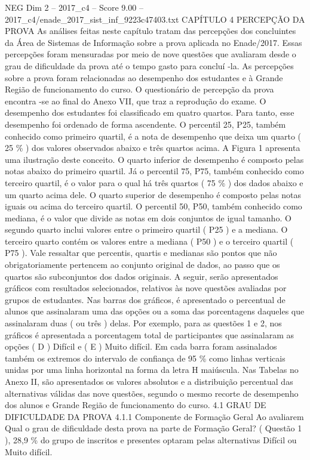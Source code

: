 \begin{textsample}{NEG Dim 2 – 2017\_c4 – Score 9.00 – 2017\_c4/enade\_2017\_sist\_inf\_9223c47403.txt}  \label{ex:f2_neg_335}
CAPÍTULO 4 PERCEPÇÃO DA PROVA As análises feitas neste capítulo tratam das percepções dos concluintes da Área de Sistemas de Informação sobre a prova aplicada no Enade/2017.
Essas percepções foram mensuradas por meio de nove questões que avaliaram desde o grau de dificuldade da prova até o tempo gasto para concluí -la.
As percepções sobre a prova foram relacionadas ao desempenho dos estudantes e à Grande Região de funcionamento do curso.
O questionário de percepção da prova encontra -se ao final do Anexo VII, que traz a reprodução do exame.
O desempenho dos estudantes foi classificado em quatro quartos.
Para tanto, esse desempenho foi ordenado de forma ascendente.
O percentil 25, P25, também conhecido como primeiro quartil, é a nota de desempenho que deixa um quarto ( 25 \% ) dos valores observados abaixo e três quartos acima.
A Figura 1 apresenta uma ilustração deste conceito.
O quarto inferior de desempenho é composto pelas notas abaixo do primeiro quartil.
Já o percentil 75, P75, também conhecido como terceiro quartil, é o valor para o qual há três quartos ( 75 \% ) dos dados abaixo e um quarto acima dele.
O quarto superior de desempenho é composto pelas notas iguais ou acima do terceiro quartil.
O percentil 50, P50, também conhecido como mediana, é o valor que divide as notas em dois conjuntos de igual tamanho.
O segundo quarto inclui valores entre o primeiro quartil ( P25 ) e a mediana.
O terceiro quarto contém os valores entre a mediana ( P50 ) e o terceiro quartil ( P75 ).
Vale ressaltar que percentis, quartis e medianas são pontos que não obrigatoriamente pertencem ao conjunto original de dados, ao passo que os quartos são subconjuntos dos dados originais.
A seguir, serão apresentados gráficos com resultados selecionados, relativos às nove questões avaliadas por grupos de estudantes.
Nas barras dos gráficos, é apresentado o percentual de alunos que assinalaram uma das opções ou a soma das porcentagens daqueles que assinalaram duas ( ou três ) delas.
Por exemplo, para as questões 1 e 2, nos gráficos é apresentada a porcentagem total de participantes que assinalaram as opções ( D ) Difícil e ( E ) Muito difícil.
Em cada barra foram assinalados também os extremos do intervalo de confiança de 95 \% como linhas verticais unidas por uma linha horizontal na forma da letra H maiúscula.
Nas Tabelas no Anexo II, são apresentados os valores absolutos e a distribuição percentual das alternativas válidas das nove questões, segundo o mesmo recorte de desempenho dos alunos e Grande Região de funcionamento do curso. 4.1 GRAU DE DIFICULDADE DA PROVA 4.1.1 Componente de Formação Geral Ao avaliarem Qual o grau de dificuldade desta prova na parte de Formação Geral? ( Questão 1 ), 28,9 \% do grupo de inscritos e presentes optaram pelas alternativas Difícil ou Muito difícil.

\end{textsample}
